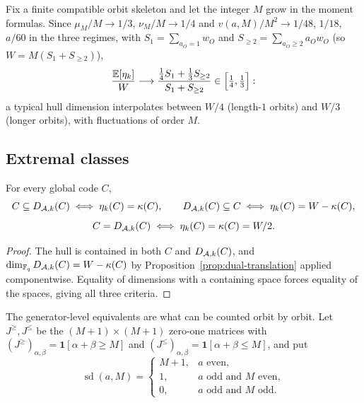 \begin{remark}\label{rem:asymptotic-moments}
Fix a finite compatible orbit skeleton and let the integer $M$ grow in the
moment formulas.  Since
$\mu_M/M\to1/3$, $\nu_M/M\to1/4$ and $v(a,M)/M^2\to1/48$, $1/18$, $a/60$ in the
three regimes, with $S_1=\sum_{a_O=1}w_O$ and
$S_{\geq2}=\sum_{a_O\geq2}a_Ow_O$ (so $W=M(S_1+S_{\geq2})$),
{\small
\[
\frac{\mathbb{E}[\eta_k]}{W}\longrightarrow
 \frac{\tfrac14S_1+\tfrac13S_{\geq2}}{S_1+S_{\geq2}}\in\Bigl[\tfrac14,\tfrac13\Bigr]:
\]
}
a typical hull dimension interpolates between $W/4$ (length-$1$ orbits) and
$W/3$ (longer orbits), with fluctuations of order $M$.
\end{remark}

\subsection{Extremal classes}\label{sec:extremal}

\begin{proposition}\label{prop:dimension-criteria}
For every global code $C$,
\[
C\subseteq D_{\mathcal A,k}(C)\iff \eta_k(C)=\kappa(C),\qquad
D_{\mathcal A,k}(C)\subseteq C\iff \eta_k(C)=W-\kappa(C),
\]
\[
C=D_{\mathcal A,k}(C)\iff \eta_k(C)=\kappa(C)=W/2.
\]
\end{proposition}

\begin{proof}
The hull is contained in both $C$ and $D_{\mathcal A,k}(C)$, and
$\dim_{\mathbb F_q}D_{\mathcal A,k}(C)=W-\kappa(C)$ by
Proposition~\ref{prop:dual-translation} applied componentwise.  Equality of
dimensions with a containing space forces equality of the spaces, giving all
three criteria.
\end{proof}

The generator-level equivalents are what can be counted orbit by orbit.  Let
$J^{\geq},J^{\leq}$ be the $(M+1)\times(M+1)$ zero-one matrices with
$(J^{\geq})_{\alpha,\beta}=\mathbf{1}[\alpha+\beta\geq M]$ and
$(J^{\leq})_{\alpha,\beta}=\mathbf{1}[\alpha+\beta\leq M]$, and put
{\small
\[
\operatorname{sd}(a,M)=
\begin{cases}
M+1,&a\text{ even},\\
1,&a\text{ odd and }M\text{ even},\\
0,&a\text{ odd and }M\text{ odd}.
\end{cases}
\]
}

